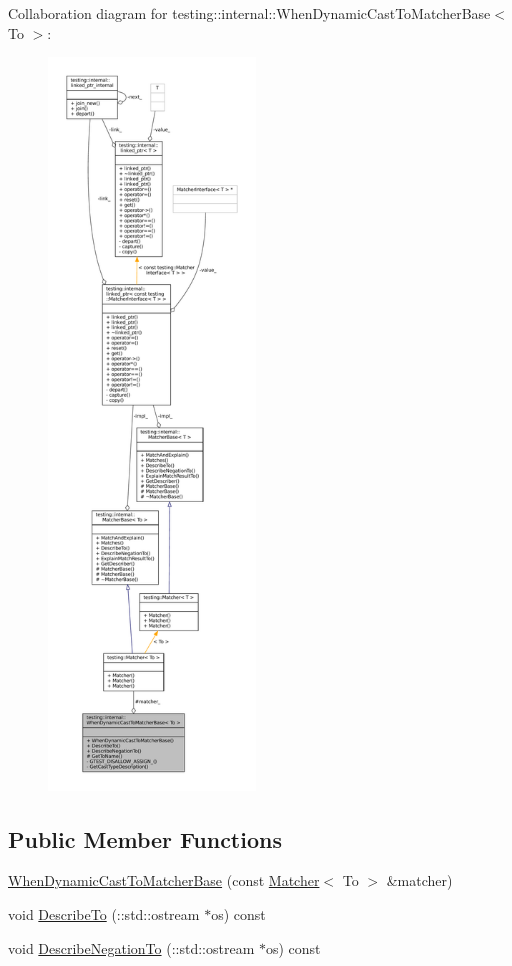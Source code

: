 Collaboration diagram for testing\+:\+:internal\+:\+:When\+Dynamic\+Cast\+To\+Matcher\+Base$<$ To $>$\+:
\nopagebreak
\begin{figure}[H]
\begin{center}
\leavevmode
\includegraphics[height=550pt]{classtesting_1_1internal_1_1WhenDynamicCastToMatcherBase__coll__graph}
\end{center}
\end{figure}
\subsection*{Public Member Functions}
\begin{DoxyCompactItemize}
\item 
\hyperlink{classtesting_1_1internal_1_1WhenDynamicCastToMatcherBase_a7da2a4c7c43d5e18db0a3233a601c8ab}{When\+Dynamic\+Cast\+To\+Matcher\+Base} (const \hyperlink{classtesting_1_1Matcher}{Matcher}$<$ To $>$ \&matcher)
\item 
void \hyperlink{classtesting_1_1internal_1_1WhenDynamicCastToMatcherBase_a6541f9bbcdc21e41521654c603cd2626}{Describe\+To} (\+::std\+::ostream $\ast$os) const
\item 
void \hyperlink{classtesting_1_1internal_1_1WhenDynamicCastToMatcherBase_a0221de18d3b1945f8bc27fb349116564}{Describe\+Negation\+To} (\+::std\+::ostream $\ast$os) const
\end{DoxyCompactItemize}
